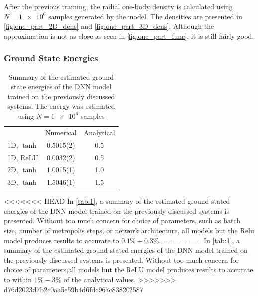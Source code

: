 After the previous training, the radial one-body density is calculated using
$N=\num{1e6}$ samples generated by the model. The densities are presented in
\autoref{fig:one_part_2D_dens} and \autoref{fig:one_part_3D_dens}. Although the
approximation is not as close as seen in \autoref{fig:one_part_func}, it is
still fairly good.  

\subsubsection{Ground State Energies}

\begin{table}[ht]
	\begin{tabular}{l|SS}
		\toprule
		           & {Numerical} & {Analytical} \\
		1D, \(\tanh\)   & 0.5015(2) &   0.5      \\
		1D, ReLU   & 0.0032(2) &   0.5      \\
		2D, \(\tanh\)   & 1.0015(1) &   1.0        \\
		3D, \(\tanh\)   & 1.5046(1) &   1.5      \\
		\bottomrule
	\end{tabular}
	\caption{Summary of the estimated ground state energies of the DNN model
      trained on the previously discussed systems. The energy was estimated
      using $N=\num{1e6}$ samples} 
	\label{tab:1}
\end{table}

<<<<<<< HEAD
In \autoref{tab:1}, a summary of the estimated ground stated energies of the DNN model trained on the previously discussed systems is presented. Without too much concern for choice of parameters, such as batch size, number of metropolis steps, or network architecture, all models but the Relu model produces results to accurate to $0.1\%-0.3\%$.
=======
In \autoref{tab:1}, a summary of the estimated ground stated energies of the DNN
model trained on the previously discussed systems is presented. Without too much
concern for choice of parameters,all models but the ReLU model produces results
to accurate to within $1\%-3\%$ of the analytical values. 
>>>>>>> d76d2023d7b2c0aa5e59b4d6fdc967c838202587


